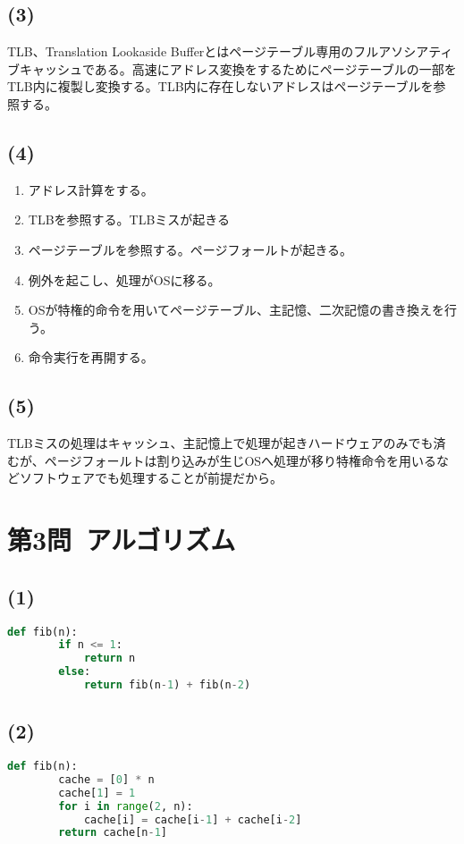 \documentclass[a4paper,12pt,xelatex,ja=standard]{bxjsarticle}
\begin{document}
  \subsection*{(3)}
  TLB、Translation Lookaside Bufferとはページテーブル専用のフルアソシアティブキャッシュである。高速にアドレス変換をするためにページテーブルの一部をTLB内に複製し変換する。TLB内に存在しないアドレスはページテーブルを参照する。

  \subsection*{(4)}
  \begin{enumerate}
    \item アドレス計算をする。
    \item TLBを参照する。TLBミスが起きる
    \item ページテーブルを参照する。ページフォールトが起きる。
    \item 例外を起こし、処理がOSに移る。
    \item OSが特権的命令を用いてページテーブル、主記憶、二次記憶の書き換えを行う。
    \item 命令実行を再開する。
  \end{enumerate}

  \subsection*{(5)}
  TLBミスの処理はキャッシュ、主記憶上で処理が起きハードウェアのみでも済むが、ページフォールトは割り込みが生じOSへ処理が移り特権命令を用いるなどソフトウェアでも処理することが前提だから。

\newpage
\section*{第3問\ アルゴリズム}
  \subsection*{(1)}
  \begin{lstlisting}[language=Python, caption=再帰呼び出し]
    def fib(n):
        if n <= 1:
            return n
        else:
            return fib(n-1) + fib(n-2)
  \end{lstlisting}

  \subsection*{(2)}
  \begin{lstlisting}[language=Python, caption=動的計画法]
    def fib(n):
        cache = [0] * n
        cache[1] = 1
        for i in range(2, n):
            cache[i] = cache[i-1] + cache[i-2]
        return cache[n-1]
  \end{lstlisting}
\end{document}
